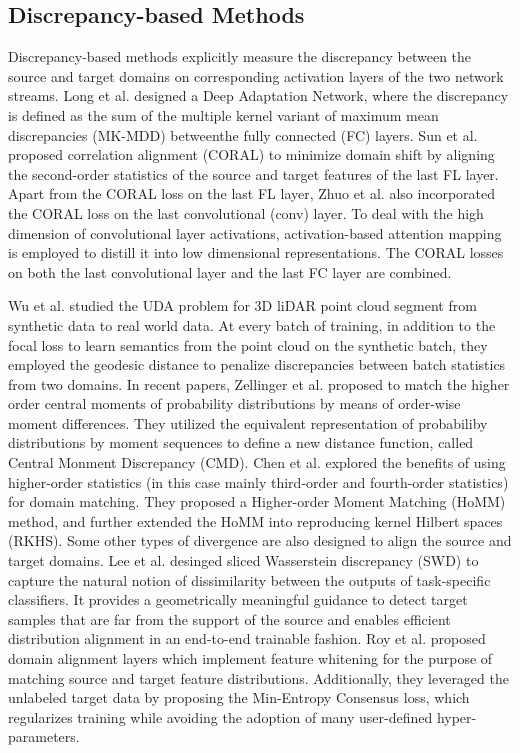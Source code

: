 \documentclass[conference]{IEEEtran}
\begin{document}
\subsection{Discrepancy-based Methods}
Discrepancy-based methods explicitly measure the discrepancy between the source and 
target domains on corresponding activation layers of the two network streams.
Long et al. designed a Deep Adaptation Network, where the discrepancy is defined
as the sum of the multiple kernel variant of maximum mean discrepancies (MK-MDD) betweenthe fully connected 
(FC) layers. 
Sun et al. proposed correlation alignment (CORAL) to minimize domain shift by aligning 
the second-order statistics of the source and target features of the last FL layer.
Apart from the CORAL loss on the last FL layer, Zhuo et al. also incorporated the CORAL loss 
on the last convolutional (conv) layer. 
To deal with the high dimension of convolutional layer activations, activation-based 
attention mapping is employed to distill it into low dimensional representations.
The CORAL losses on both the last convolutional layer and the last FC layer are combined.

Wu et al. studied the UDA problem for 3D liDAR point cloud segment from
synthetic data to real world data. 
At every batch of training, in addition to the focal loss to learn 
semantics from the point cloud on the synthetic batch, they employed the geodesic
distance to penalize discrepancies between batch statistics from two domains.
In recent papers, Zellinger et al. proposed to match the higher order 
central moments of probability distributions by means of order-wise moment
differences. 
They utilized the equivalent representation of probabiliby distributions 
by moment sequences to define a new distance function, called Central Monment
Discrepancy (CMD). 
Chen et al. explored the benefits of using higher-order statistics 
(in this case mainly third-order and fourth-order statistics) for domain
matching.
They proposed a Higher-order Moment Matching (HoMM) method, and further
extended the HoMM into reproducing kernel Hilbert spaces (RKHS).
Some other types of divergence are also designed to align the source and 
target domains. 
Lee et al. desinged sliced Wasserstein discrepancy (SWD) to capture the natural 
notion of dissimilarity between the outputs of task-specific classifiers.
It provides a geometrically meaningful guidance to detect target samples
that are far from the support of the source and enables efficient distribution alignment
in an end-to-end trainable fashion. 
Roy et al. proposed domain alignment layers which implement feature whitening 
for the purpose of matching source and target feature distributions.
Additionally, they leveraged the unlabeled target data by proposing the Min-Entropy
Consensus loss, which regularizes training while avoiding the adoption of 
many user-defined hyper-parameters. 
\end{document}
